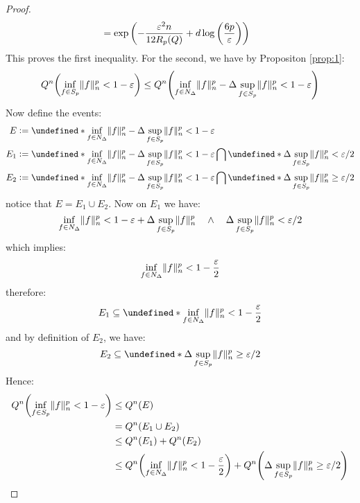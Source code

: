 \documentclass{article}
\theoremstyle{plain}
\theoremstyle{definition}
\theoremstyle{remark}
\newcommand{\defeq}{\vcentcolon=}
\let\brace\undefined
\DeclarePairedDelimiter{\brace}{\lbrace}{\rbrace}
\DeclarePairedDelimiter{\paren}{\lparen}{\rparen}
\newcommand{\eps}{\varepsilon}
\newcommand{\logp}[1]{\log{\left(#1\right)}}
\DeclarePairedDelimiter{\norm}{\lVert}{\rVert}
\begin{document}
\begin{proof}
\begin{align*}
        &= \exp{\paren*{-\frac{\eps^2n}{12 R_p(Q)} + d \logp{\frac{6p}{\eps}}}}
    \end{align*}
    This proves the first inequality. For the second, we have by Propositon \ref{prop:1}:
    \begin{equation*}
        Q^{n}\paren*{\inf_{f \in S_p} \norm{f}_n^{p} < 1- \eps} \leq Q^{n}\paren*{\inf_{f \in N_{\Delta}} \norm{f}_n^p - \Delta \sup_{f \in S_p} \norm{f}_n^p < 1 - \eps}
    \end{equation*}
    Now define the events:
    \begin{align*}
        E &\defeq \brace*{\inf_{f \in N_{\Delta}} \norm{f}_n^p - \Delta \sup_{f \in S_p} \norm{f}_n^p < 1 - \eps}\\
        E_1 &\defeq \brace*{\inf_{f \in N_{\Delta}} \norm{f}_n^p - \Delta \sup_{f \in S_p} \norm{f}_n^p < 1 - \eps} \bigcap \brace*{\Delta \sup_{f \in S_p} \norm{f}_n^p < \eps/2} \\
        E_2 &\defeq \brace*{\inf_{f \in N_{\Delta}} \norm{f}_n^p - \Delta \sup_{f \in S_p} \norm{f}_n^p < 1 - \eps} \bigcap \brace*{\Delta \sup_{f \in S_p} \norm{f}_n^p \geq \eps/2}
    \end{align*}
    notice that $E = E_1 \cup E_2$. Now on $E_1$ we have:
    \begin{equation*}
        \inf_{f \in N_{\Delta}} \norm{f}_n^p < 1 - \eps + \Delta \sup_{f \in S_p} \norm{f}_n^p \quad \land \quad \Delta \sup_{f \in S_p} \norm{f}_n^p < \eps/2
    \end{equation*}
    which implies:
    \begin{equation*}
        \inf_{f \in N_{\Delta}} \norm{f}_{n}^p < 1-\frac{\eps}{2}
    \end{equation*}
    therefore:
    \begin{equation*}
        E_1 \subseteq \brace*{\inf_{f \in N_{\Delta}} \norm{f}_{n}^p < 1-\frac{\eps}{2}}
    \end{equation*}
    and by definition of $E_2$, we have:
    \begin{equation*}
        E_2 \subseteq \brace*{\Delta \sup_{f \in S_p} \norm{f}_n^p \geq \eps/2}
    \end{equation*}
    Hence:
    \begin{align*}
        Q^{n}\paren*{\inf_{f \in S_p} \norm{f}_n^{p} < 1- \eps} &\leq Q^{n}(E) \\
        &= Q^{n}(E_1 \cup E_2) \\
        &\leq Q^{n}(E_1) + Q^{n}(E_2) \\
        &\leq Q^{n}\paren*{\inf_{f \in N_{\Delta}} \norm{f}_{n}^p < 1-\frac{\eps}{2}} + Q^{n}\paren*{\Delta \sup_{f \in S_p} \norm{f}_n^p \geq \eps/2} 
    \end{align*}


\end{proof}
\end{document}
